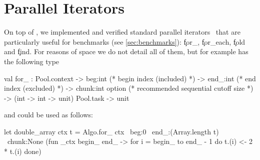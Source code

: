 \section{Parallel Iterators}
\label{sec:parabs_algorithms}

On top of , we  implemented and verified standard parallel iterators~ that are particularly useful for benchmarks (see \cref{sec:benchmarks}): \c{for\_}, \c{for\_each}, \c{fold} and \c{find}. For reasons of space we do not detail all of them, but for example  has the following type
\begin{ocamlcode}
val for_ :
  Pool.context ->
  beg:int (* begin index (included) *) ->
  end_:int (* end index (excluded) *) ->
  chunk:int option (* recommended sequential cutoff size *) ->
  (int -> int -> unit) Pool.task -> unit
\end{ocamlcode}
%
and could be used as follows:
\begin{ocamlcode}
let double_array ctx t =
  Algo.for_ ctx ~beg:0 ~end_:(Array.length t) ~chunk:None 
    (fun _ctx begin_ end_ ->
      for i = begin_ to end_ - 1 do
        t.(i) <- 2 * t.(i)
      done)
\end{ocamlcode}
